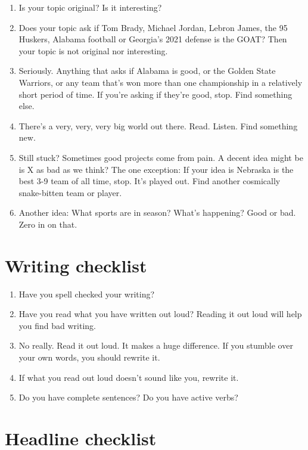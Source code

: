 \documentclass[
  letterpaper,
  DIV=11,
  numbers=noendperiod]{scrreprt}
\providecommand{\tightlist}{%
  \setlength{\itemsep}{0pt}\setlength{\parskip}{0pt}}\usepackage{longtable,booktabs,array}
\begin{document}
\begin{enumerate}
\def\labelenumi{\arabic{enumi}.}
\tightlist
\item
  Is your topic original? Is it interesting?
\item
  Does your topic ask if Tom Brady, Michael Jordan, Lebron James, the 95
  Huskers, Alabama football or Georgia's 2021 defense is the GOAT? Then
  your topic is not original nor interesting.
\item
  Seriously. Anything that asks if Alabama is good, or the Golden State
  Warriors, or any team that's won more than one championship in a
  relatively short period of time. If you're asking if they're good,
  stop. Find something else.
\item
  There's a very, very, very big world out there. Read. Listen. Find
  something new.
\item
  Still stuck? Sometimes good projects come from pain. A decent idea
  might be is X as bad as we think? The one exception: If your idea is
  Nebraska is the best 3-9 team of all time, stop. It's played out. Find
  another cosmically snake-bitten team or player.
\item
  Another idea: What sports are in season? What's happening? Good or
  bad. Zero in on that.
\end{enumerate}

\hypertarget{writing-checklist}{%
\section{Writing checklist}\label{writing-checklist}}

\begin{enumerate}
\def\labelenumi{\arabic{enumi}.}
\tightlist
\item
  Have you spell checked your writing?
\item
  Have you read what you have written out loud? Reading it out loud will
  help you find bad writing.
\item
  No really. Read it out loud. It makes a huge difference. If you
  stumble over your own words, you should rewrite it.
\item
  If what you read out loud doesn't sound like you, rewrite it.
\item
  Do you have complete sentences? Do you have active verbs?
\end{enumerate}

\hypertarget{headline-checklist}{%
\section{Headline checklist}\label{headline-checklist}}
\end{document}
